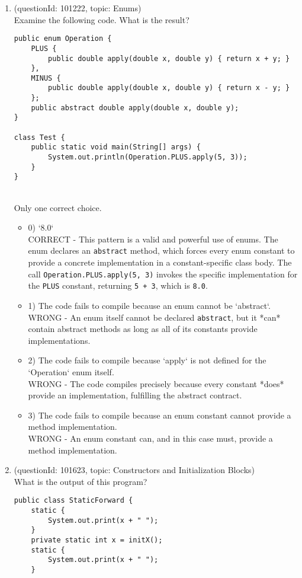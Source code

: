 \documentclass[12pt]{article}
\begin{document}
\begin{enumerate}[label=(\arabic*)]
\begin{itemize}
\end{itemize}
\item (questionId: 101222, topic: Enums) \\ 
Examine the following code. What is the result?
\begin{verbatim}
public enum Operation {
    PLUS {
        public double apply(double x, double y) { return x + y; }
    },
    MINUS {
        public double apply(double x, double y) { return x - y; }
    };
    public abstract double apply(double x, double y);
}

class Test {
    public static void main(String[] args) {
        System.out.println(Operation.PLUS.apply(5, 3));
    }
}
\end{verbatim}
\\ \noindent Only one correct choice. 
\begin{itemize}
\item 0) `8.0`
 \\ 
CORRECT - This pattern is a valid and powerful use of enums. The enum declares an \verb|abstract| method, which forces every enum constant to provide a concrete implementation in a constant-specific class body. The call \verb|Operation.PLUS.apply(5, 3)| invokes the specific implementation for the \verb|PLUS| constant, returning \verb|5 + 3|, which is \verb|8.0|.

\item 1) The code fails to compile because an enum cannot be `abstract`.
 \\ 
WRONG - An enum itself cannot be declared \verb|abstract|, but it *can* contain abstract methods as long as all of its constants provide implementations.

\item 2) The code fails to compile because `apply` is not defined for the `Operation` enum itself.
 \\ 
WRONG - The code compiles precisely because every constant *does* provide an implementation, fulfilling the abstract contract.

\item 3) The code fails to compile because an enum constant cannot provide a method implementation.
 \\ 
WRONG - An enum constant can, and in this case must, provide a method implementation.

\end{itemize}
\item (questionId: 101623, topic: Constructors and Initialization Blocks) \\ 
What is the output of this program?\n\begin{verbatim}
public class StaticForward {
    static {
        System.out.print(x + " ");
    }
    private static int x = initX();
    static {
        System.out.print(x + " ");
    }


\end{verbatim}
\end{enumerate}
\end{document}
